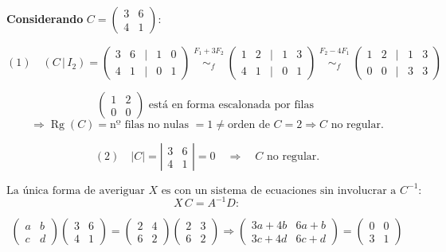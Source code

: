 \documentclass[a4paper,12pt]{article}
\begin{document}
\begin{ejercicio}[title=Ejercicio 19]
\bigskip

\textbf{Considerando} \(C=\begin{pmatrix}3 & 6\\4 & 1\end{pmatrix}\):

\bigskip

\[
(1) \quad (C \,|\, I_2) =
\begin{pmatrix}
3 & 6 &\Big|& 1 & 0\\
4 & 1 &\Big|& 0 & 1
\end{pmatrix}
\overset{\substack{F_1 + 3F_2 \\ {}}}{\sim_f}
\begin{pmatrix}
1 & 2 &\Big|& 1 & 3\\
4 & 1 &\Big|& 0 & 1
\end{pmatrix}
\overset{\substack{F_2 - 4F_1 \\ {}}}{\sim_f}
\begin{pmatrix}
1 & 2 &\Big|& 1 & 3\\
0 & 0 &\Big|& 3 & 3
\end{pmatrix}
\]

\vspace{0.5em}

\noindent
\[
\begin{pmatrix}
1 & 2\\
0 & 0
\end{pmatrix}
\text{ está en forma escalonada por filas }
\]
\[\Rightarrow \operatorname{Rg}(C)=\text{nº filas no nulas }=1 \neq \text{orden de }C=2 \Rightarrow C \text{ no regular.}
\]

\[
(2)\quad |C| =
\left|
\begin{matrix}
3 & 6\\
4 & 1
\end{matrix}
\right|
= 0
\quad\Rightarrow\quad C \text{ no regular.}
\]

\[
\text{La única forma de averiguar }X\text{ es con un sistema de ecuaciones sin involucrar a $C^{-1}$:}
\]
\[
X \, C = A^{-1} D:
\]

\[
\begin{pmatrix} a & b \\ c & d \end{pmatrix}
\begin{pmatrix} 3 & 6 \\ 4 & 1 \end{pmatrix}
=
\begin{pmatrix} 2 & 4 \\ 6 & 2 \end{pmatrix}
\begin{pmatrix} 2 & 3 \\ 6 & 2 \end{pmatrix}
\Rightarrow
\begin{pmatrix}
3a+4b & 6a+b\\
3c+4d & 6c+d
\end{pmatrix}
=
\begin{pmatrix}
0 & 0\\
3 & 1
\end{pmatrix}
\]


\end{ejercicio}
\end{document}
